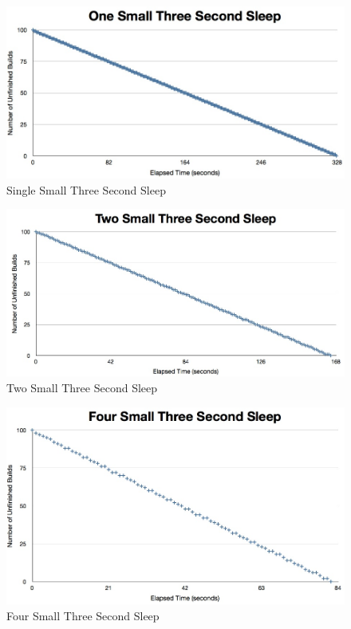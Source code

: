 \documentclass{scrartcl}
\begin{document}
\begin{figure}[h!]
  \begin{center}
    \includegraphics[scale=0.45]{raw_data/sleep3/one_small/graph.jpg}
  \end{center}
  \caption{Single Small Three Second Sleep}
  \label{fig:sleep3_one_small_queuelength}
\end{figure}

\begin{figure}[h!]
  \begin{center}
    \includegraphics[scale=0.45]{raw_data/sleep3/two_small/graph.jpg}
  \end{center}
  \caption{Two Small Three Second Sleep}
  \label{fig:sleep3_two_small_queuelength}
\end{figure}

\begin{figure}[h!]
  \begin{center}
    \includegraphics[scale=0.45]{raw_data/sleep3/four_small/graph.jpg}
  \end{center}
  \caption{Four Small Three Second Sleep}
  \label{fig:sleep3_four_small_queuelength}
\end{figure}
\end{document}
